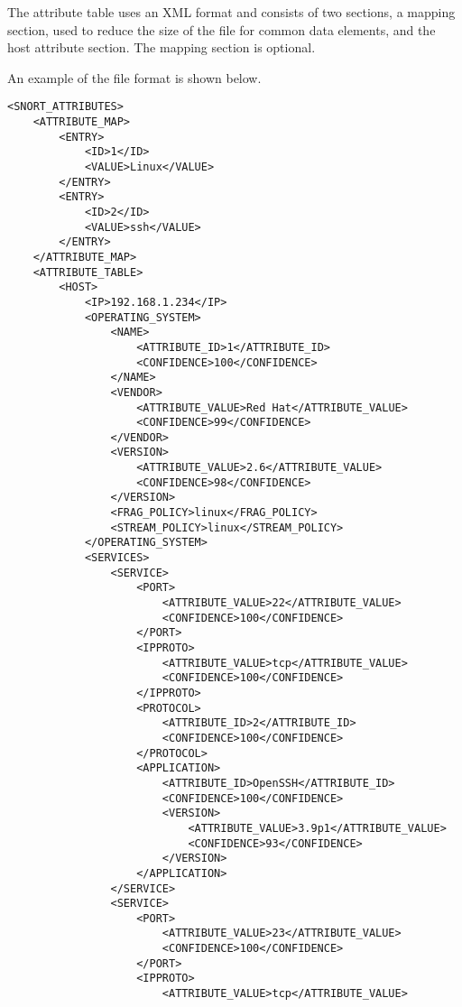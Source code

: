 \documentclass[english]{report}
\begin{document}
The attribute table uses an XML format and consists of two sections, a
mapping section, used to reduce the size of the file for common data
elements, and the host attribute section.  The mapping section is optional.

An example of the file format is shown below.

\begin{verbatim}
<SNORT_ATTRIBUTES>
    <ATTRIBUTE_MAP>
        <ENTRY>
            <ID>1</ID>
            <VALUE>Linux</VALUE>
        </ENTRY>
        <ENTRY>
            <ID>2</ID>
            <VALUE>ssh</VALUE>
        </ENTRY>
    </ATTRIBUTE_MAP>
    <ATTRIBUTE_TABLE>
        <HOST>
            <IP>192.168.1.234</IP>
            <OPERATING_SYSTEM>
                <NAME>
                    <ATTRIBUTE_ID>1</ATTRIBUTE_ID>
                    <CONFIDENCE>100</CONFIDENCE>
                </NAME>
                <VENDOR>
                    <ATTRIBUTE_VALUE>Red Hat</ATTRIBUTE_VALUE>
                    <CONFIDENCE>99</CONFIDENCE>
                </VENDOR>
                <VERSION>
                    <ATTRIBUTE_VALUE>2.6</ATTRIBUTE_VALUE>
                    <CONFIDENCE>98</CONFIDENCE>
                </VERSION>
                <FRAG_POLICY>linux</FRAG_POLICY>
                <STREAM_POLICY>linux</STREAM_POLICY>
            </OPERATING_SYSTEM>
            <SERVICES>
                <SERVICE>
                    <PORT>
                        <ATTRIBUTE_VALUE>22</ATTRIBUTE_VALUE>
                        <CONFIDENCE>100</CONFIDENCE>
                    </PORT>
                    <IPPROTO>
                        <ATTRIBUTE_VALUE>tcp</ATTRIBUTE_VALUE>
                        <CONFIDENCE>100</CONFIDENCE>
                    </IPPROTO>
                    <PROTOCOL>
                        <ATTRIBUTE_ID>2</ATTRIBUTE_ID>
                        <CONFIDENCE>100</CONFIDENCE>
                    </PROTOCOL>
                    <APPLICATION>
                        <ATTRIBUTE_ID>OpenSSH</ATTRIBUTE_ID>
                        <CONFIDENCE>100</CONFIDENCE>
                        <VERSION>
                            <ATTRIBUTE_VALUE>3.9p1</ATTRIBUTE_VALUE>
                            <CONFIDENCE>93</CONFIDENCE>
                        </VERSION>
                    </APPLICATION>
                </SERVICE>
                <SERVICE>
                    <PORT>
                        <ATTRIBUTE_VALUE>23</ATTRIBUTE_VALUE>
                        <CONFIDENCE>100</CONFIDENCE>
                    </PORT>
                    <IPPROTO>
                        <ATTRIBUTE_VALUE>tcp</ATTRIBUTE_VALUE>

\end{verbatim}
\end{document}
